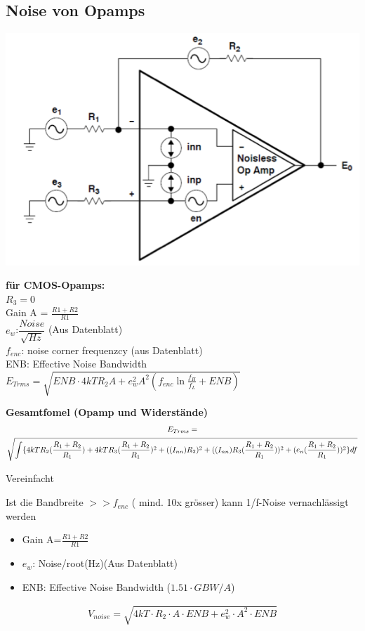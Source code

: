 \subsection{Noise von Opamps}
\begin{multicols}{2}
	\includegraphics[scale=0.4]{pictures/oampnoise}
	\columnbreak
	
	\textbf{für CMOS-Opamps:} \\
	$R_3=0$ \\
	Gain A = $\frac{R1+R2}{R1}$ \\
	$e_{w}$:$\dfrac{Noise}{\sqrt{Hz}}$ (Aus Datenblatt) \\
	$f_{enc}$: noise corner frequenzcy (aus Datenblatt) \\
	ENB: Effective Noise Bandwidth \\
	$E_{Trms}=\sqrt{ENB \cdot 4kTR_{2}A+e_{w}^2A^2(f_{enc}\ln{\frac{f_{H}}{f_{L}}}+ENB)}$
\end{multicols}

\textbf{Gesamtfomel (Opamp und Widerstände)}\\
\begin{gather*}
E_{Trms}=\notag\\\sqrt{\int
\{4kTR_{2}(\frac{R_{1}+R_{2}}{R_{1}})+4kTR_{3}(\frac{R_{1}+R_{2}}{R_{1}})^2+((I_{nn})R_{2})^2+((I_{nn})R_{3}(\frac{R_{1}+R_{2}}{R_{1}}))^2+(e_{n}(\frac{R_{1}+R_{2}}{R_{1}}))^2\}df}
\end{gather*}


Vereinfacht 


Ist die Bandbreite $>>f_{enc}$ ( mind. 10x grösser) kann 1/f-Noise
vernachlässigt werden
\begin{itemize}
  \item Gain A=$\frac{R1+R2}{R1}$
  \item $e_{w}$: Noise/root(Hz)(Aus Datenblatt)
  \item ENB: Effective Noise Bandwidth ($1.51 \cdot GBW/A$)
\end{itemize}
\begin{gather*}
V_{noise}=\sqrt{4kT \cdot R_{2} \cdot A \cdot ENB+e_{w}^2 \cdot A^2 \cdot ENB}
\end{gather*}
